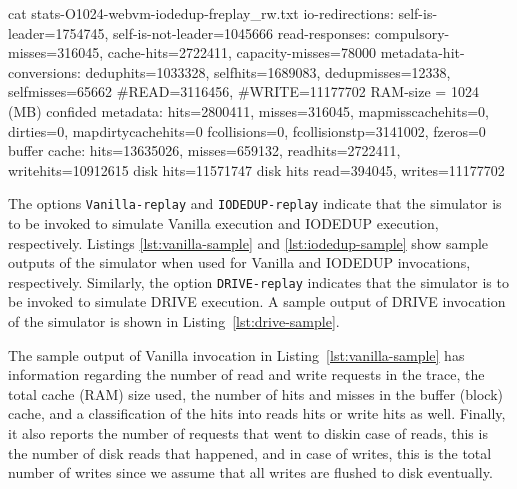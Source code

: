 
\begin{snippet}
cat stats-O1024-webvm-iodedup-freplay_rw.txt 
io-redirections: self-is-leader=1754745, self-is-not-leader=1045666
read-responses: compulsory-misses=316045, cache-hits=2722411, capacity-misses=78000
metadata-hit-conversions: deduphits=1033328, selfhits=1689083, dedupmisses=12338, selfmisses=65662
#READ=3116456, #WRITE=11177702
RAM-size = 1024 (MB)
confided metadata: hits=2800411, misses=316045, mapmisscachehits=0, dirties=0, mapdirtycachehits=0
fcollisions=0, fcollisionstp=3141002, fzeros=0
buffer cache: hits=13635026, misses=659132, readhits=2722411, writehits=10912615
disk hits=11571747
disk hits read=394045, writes=11177702
\end{snippet}

The options \texttt{Vanilla-replay} and \texttt{IODEDUP-replay} indicate
that the simulator is to be invoked to simulate Vanilla execution and
IODEDUP execution, respectively.
Listings \ref{lst:vanilla-sample} and \ref{lst:iodedup-sample} 
show sample outputs of the simulator when used for Vanilla and
IODEDUP invocations, respectively.
Similarly, the option \texttt{DRIVE-replay} indicates that the
simulator is to be invoked to simulate DRIVE execution.
A sample output of DRIVE invocation of the simulator 
is shown in Listing~\ref{lst:drive-sample}.

The sample output of Vanilla invocation in Listing~\ref{lst:vanilla-sample}
has information regarding the number of read and write requests in the trace,
the total cache (RAM) size used, the number of hits and misses in the 
buffer (block) cache, and a classification of the hits into reads hits or
write hits as well. Finally, it also reports the number of requests that
went to disk\textemdash{}in case of reads, this is the number of disk 
reads that happened, and in case of writes, this is the total number of
writes since we assume that all writes are flushed to disk eventually.

